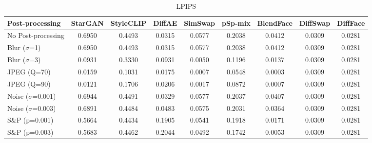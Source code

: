\documentclass{article}
\begin{document}
\begin{table}[h!]
\begin{subtable}{\textwidth}
\caption{LPIPS}
\centering
\scriptsize
\begin{tabular}{lcccccccc}
\toprule
\textbf{Post-processing} & StarGAN & StyleCLIP & DiffAE & SimSwap & pSp-mix & BlendFace & DiffSwap & DiffFace \\
\midrule
No Post-processing & 0.6950 & 0.4493 & 0.0315 & 0.0577 & 0.2038 & 0.0412 & 0.0309 & 0.0281 \\
\midrule
Blur ($\sigma$=1) & 0.6950 & 0.4493 & 0.0315 & 0.0577 & 0.2038 & 0.0412 & 0.0309 & 0.0281 \\
Blur ($\sigma$=3) & 0.0931 & 0.3330 & 0.0931 & 0.0050 & 0.1196 & 0.0137 & 0.0309 & 0.0281 \\
JPEG (Q=70) & 0.0159 & 0.1031 & 0.0175 & 0.0007 & 0.0548 & 0.0003 & 0.0309 & 0.0281 \\
JPEG (Q=90) & 0.0121 & 0.1706 & 0.0206 & 0.0017 & 0.0872 & 0.0007 & 0.0309 & 0.0281 \\
Noise ($\sigma$=0.001) & 0.6944 & 0.4491 & 0.0329 & 0.0577 & 0.2037 & 0.0407 & 0.0309 & 0.0281 \\
Noise ($\sigma$=0.003) & 0.6891 & 0.4484 & 0.0483 & 0.0575 & 0.2031 & 0.0364 & 0.0309 & 0.0281 \\
S\&P (p=0.001) & 0.5664 & 0.4434 & 0.1905 & 0.0541 & 0.1918 & 0.0171 & 0.0309 & 0.0281 \\
S\&P (p=0.003) & 0.5683 & 0.4462 & 0.2044 & 0.0492 & 0.1742 & 0.0053 & 0.0309 & 0.0281 \\
\bottomrule
\end{tabular}
\end{subtable}


\end{table}
\end{document}
